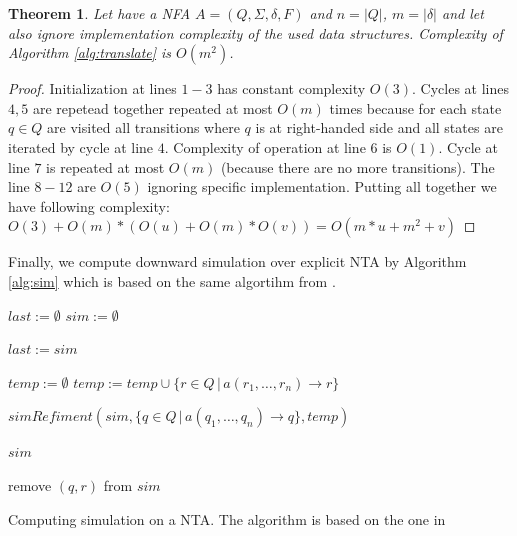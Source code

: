 \documentclass[a4paper, 12pt]{article}
\let\oldnl\nl%
\newcommand{\nonl}{\renewcommand{\nl}{\let\nl\oldnl}}%
\newtheorem{theorem}{Theorem}
\begin{document}
\begin{theorem}
Let have a NFA $A = (Q, \Sigma, \delta, F)$ and $n = |Q|$, $m = |\delta|$ and let also ignore implementation
complexity of the used data structures.
Complexity of Algorithm \ref{alg:translate} is $O(m^2)$.
\end{theorem}

\begin{proof}
	Initialization at lines $1-3$ has constant complexity $O(3)$.
	Cycles at lines $4,5$ are repetead together repeated at most $O(m)$ times because for each state $q\in Q$ are
	visited all transitions where $q$ is at right-handed side  and all states are iterated by cycle at line $4$.
	Complexity of operation at line $6$ is $O(1)$.
	Cycle at line $7$ is repeated at most $O(m)$ (because there are no more transitions).
	The line $8-12$ are $O(5)$ ignoring specific implementation.
	Putting all together we have following complexity: $O(3) + O(m)*(O(u)+O(m)*O(v)) = O(m*u + m^2+v)$

\end{proof}

Finally, we compute downward simulation over explicit NTA by Algorithm \ref{alg:sim} which is based on the same algortihm from \cite{lengal:trees}.
\begin{algorithm}[h]
\label{alg:sim}
    
	$last := \emptyset $\;
    $sim := \emptyset $\;
	{
		$last := sim$\;
		{
			{
				{
					$temp := \emptyset$\;
					{
						$temp := temp \cup \{r \in Q \,|\, a(r_1,\ldots, r_n) \rightarrow r\}$\;
					}

					$simRefiment(sim, \{q \in Q \,|\, a(q_1,\ldots, q_n) \rightarrow q\}, temp)$\;
				}
			}
		}

	}
	\Return $sim$\;
	\DontPrintSemicolon \nonl\;
	\setcounter{AlgoLine}{0}

	\nonl {}
	{
		{
			{
				{
					remove $(q,r)$ from $sim$ \;
				}
			}
		}
	 }
	 \caption{Computing simulation on a NTA. The algorithm is based on the one in \cite{lengal:trees}}
\end{algorithm}
\end{document}
